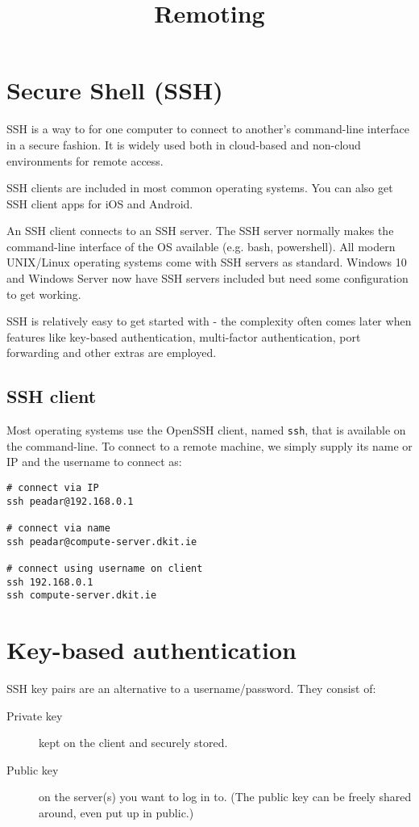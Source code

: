 \documentclass{pgnotes}
\title{Remoting}
\begin{document}
\maketitle

\section{Secure Shell (SSH)}

SSH is a way to for one computer to connect to another's command-line interface in a secure fashion.
It is widely used both in cloud-based and non-cloud environments for remote access.

SSH clients are included in most common operating systems.
You can also get SSH client apps for iOS and Android.

An SSH client connects to an SSH server.
The SSH server normally makes the command-line interface of the OS available (e.g. bash, powershell).
All modern UNIX/Linux operating systems come with SSH servers as standard.
Windows 10 and Windows Server now have SSH servers included but need some configuration to get working.

SSH is relatively easy to get started with - the complexity often comes later when features like key-based authentication, multi-factor authentication, port forwarding and other extras are employed.

\subsection{SSH client}

Most operating systems use the OpenSSH client, named \texttt{ssh}, that is available on the command-line.
To connect to a remote machine, we simply supply its name or IP and the username to connect as:
\begin{verbatim}
# connect via IP
ssh peadar@192.168.0.1

# connect via name
ssh peadar@compute-server.dkit.ie

# connect using username on client
ssh 192.168.0.1
ssh compute-server.dkit.ie
\end{verbatim}

\section{Key-based authentication}

SSH key pairs are an alternative to a username/password. They consist of:
\begin{description}
\item[Private key] kept on the client and securely stored.
\item[Public key] on the server(s) you want to log in to. (The public key can be freely shared around, even put up in public.)
\end{description}
\end{document}
